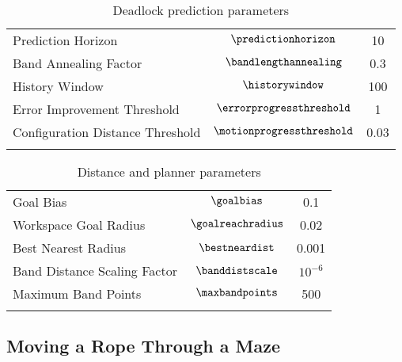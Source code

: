 \begin{table}[ht]
\centering
\caption{Deadlock prediction parameters}
\label{tab:deadlock_param_table}
\begin{tabular}{lcc}
\noalign{\smallskip}\hline\noalign{\smallskip}
Prediction Horizon                  & $\predictionhorizon$          &    10 \\
Band Annealing Factor               & $\bandlengthannealing$        &   0.3 \\
History Window                      & $\historywindow$              &   100 \\
Error Improvement Threshold         & $\errorprogressthreshold$     &     1 \\
Configuration Distance Threshold    & $\motionprogressthreshold$    &  0.03 \\
\noalign{\smallskip}\hline
\end{tabular}
\end{table}


\begin{table}[ht]
\centering
\caption{Distance and planner parameters}
\label{tab:rrt_param_table}
\begin{tabular}{lcc}
\noalign{\smallskip}\hline\noalign{\smallskip}
Goal Bias                           & $\goalbias$                   &     0.1 \\
Workspace Goal Radius               & $\goalreachradius$            &     0.02 \\
Best Nearest Radius                 & $\bestneardist$               &     0.001 \\
Band Distance Scaling Factor        & $\banddistscale$              & $10^{-6}$ \\
Maximum Band Points                 & $\maxbandpoints$              & 500 \\
\noalign{\smallskip}\hline
\end{tabular}
\end{table}




\subsection{Moving a Rope Through a Maze}


